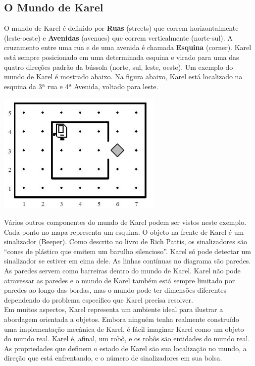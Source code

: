 \documentclass[a4paper,11pt]{article}
\begin{document}
\subsection{O Mundo de Karel}
O mundo de Karel é definido por \textbf{Ruas} (streets) que correm horizontalmente (leste-oeste) e \textbf{Avenidas} (avenues) que correm verticalmente (norte-sul). A cruzamento entre uma rua e de uma avenida é chamada \textbf{Esquina} (corner). Karel está sempre posicionado em uma determinada esquina e virado para uma das quatro direções padrão da bússola (norte, sul, leste, oeste). Um exemplo do mundo de Karel é mostrado abaixo. Na figura abaixo, Karel está localizado na esquina da 3ª rua e 4ª Avenida, voltado para leste.
\begin{center} 
\includegraphics[width=0.6\textwidth]{mundo.jpg} 
\end{center}
Vários outros componentes do mundo de Karel podem ser vistos neste exemplo. Cada ponto no mapa representa um esquina. O objeto na frente de Karel é um sinalizador (Beeper). Como descrito no livro de Rich Pattis, os sinalizadores são ``cones de plástico que emitem um barulho silencioso''. Karel só pode detectar um sinalizador se estiver em cima dele. As linhas contínuas no diagrama são paredes. As paredes servem como barreiras dentro do mundo de Karel. Karel não pode atravessar as paredes e o mundo de Karel também está sempre limitado por paredes ao longo das bordas, mas o mundo pode ter dimensões diferentes dependendo do problema específico que Karel precisa resolver. \\[3mm]
Em muitos aspectos, Karel representa um ambiente ideal para ilustrar a abordagem orientada a objetos. Embora ninguém tenha realmente construído uma  implementação mecânica de Karel, é fácil imaginar Karel como um objeto do mundo real. Karel é, afinal, um robô, e os robôs são entidades do mundo real. As propriedades que definem o estado de Karel são sua localização no mundo, a direção que está enfrentando, e o número de sinalizadores em sua bolsa. 
\end{document}
